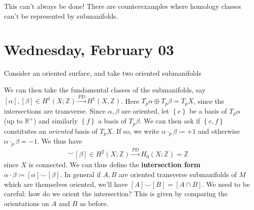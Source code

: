 \begin{warnings}

This can't always be done! There are counterexamples where homology
classes can't be represented by submanifolds.

\end{warnings}

\hypertarget{wednesday-february-03}{%
\section{Wednesday, February 03}\label{wednesday-february-03}}

Consider an oriented surface, and take two oriented submanifolds

\begin{figure}
\centering
{}
\end{figure}

We can then take the fundamental classes of the submanifolds, say
\([\alpha], [\beta] \in H^1(X; {\mathbb{Z}}) \xrightarrow{PD} H^1(X, {\mathbb{Z}})\).
Here \(T_p \alpha \oplus T_p \beta = T_p X\), since the intersections
are transverse. Since \(\alpha, \beta\) are oriented, let
\(\left\{{ e }\right\}\) be a basis of \(T_p \alpha\) (up to
\({\mathbb{R}}^+\)) and similarly \(\left\{{ f }\right\}\) a basis of
\(T_p \beta\). We can then ask if \(\left\{{ e, f }\right\}\)
constitutes an \emph{oriented} basis of \(T_pX\). If so, we write
\(\alpha \cdot_p \beta \coloneqq+1\) and otherwise
\(\alpha \cdot_p \beta = - 1\). We thus have
\begin{align*}
[ \alpha] \smile[ \beta] \in H^2(X; {\mathbb{Z}}) \xrightarrow{PD} H_0(X; {\mathbb{Z}}) = {\mathbb{Z}}
\end{align*}
since \(X\) is connected. We can thus define the \textbf{intersection
form} \(\alpha\cdot \beta\coloneqq[ \alpha] \smile[ \beta]\). In general
if \(A, B\) are oriented transverse submanifolds of \(M\) which are
themselves oriented, we'll have \([A] \smile[B] = [A \cap B]\). We need
to be careful: how do we orient the intersection? This is given by
comparing the orientations on \(A\) and \(B\) as before.

